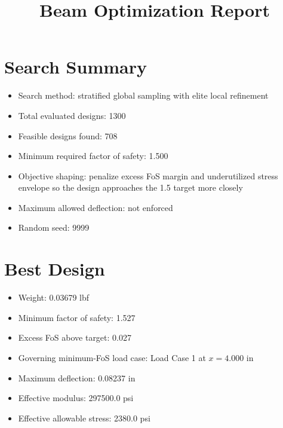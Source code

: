 \documentclass[11pt]{article}
\title{Beam Optimization Report}
\date{}
\begin{document}
\maketitle

\section*{Search Summary}
\begin{itemize}
\item Search method: stratified global sampling with elite local refinement
\item Total evaluated designs: 1300
\item Feasible designs found: 708
\item Minimum required factor of safety: 1.500
\item Objective shaping: penalize excess FoS margin and underutilized stress envelope so the design approaches the 1.5 target more closely
\item Maximum allowed deflection: not enforced
\item Random seed: 9999
\end{itemize}

\section*{Best Design}
\begin{itemize}
\item Weight: 0.03679 lbf
\item Minimum factor of safety: 1.527
\item Excess FoS above target: 0.027
\item Governing minimum-FoS load case: Load Case 1 at $x=4.000$ in
\item Maximum deflection: 0.08237 in
\item Effective modulus: 297500.0 psi
\item Effective allowable stress: 2380.0 psi
\end{itemize}
\end{document}
